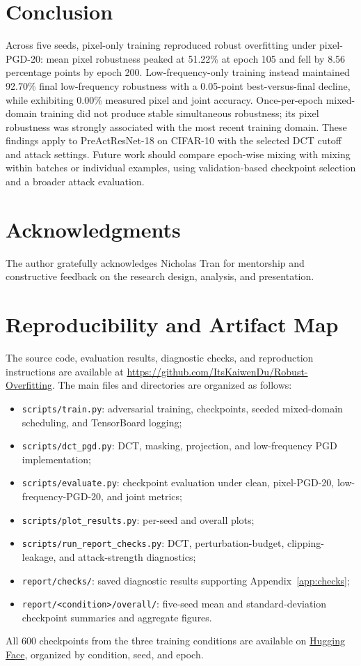 \documentclass[11pt]{article}
\begin{document}
\section{Conclusion}
\label{sec:conclusion}
Across five seeds, pixel-only training reproduced robust overfitting under
pixel-PGD-20: mean pixel robustness peaked at 51.22\% at epoch 105 and fell
by 8.56 percentage points by epoch 200. Low-frequency-only training instead
maintained 92.70\% final low-frequency robustness with a 0.05-point
best-versus-final decline, while exhibiting 0.00\% measured pixel and
joint accuracy. Once-per-epoch mixed-domain training did not produce
stable simultaneous robustness; its pixel robustness was strongly associated
with the most recent training domain. These findings apply to PreActResNet-18 on CIFAR-10 with the selected DCT
cutoff and attack settings. Future work should compare epoch-wise mixing
with mixing within batches or individual examples, using validation-based
checkpoint selection and a broader attack evaluation.

\section*{Acknowledgments}
The author gratefully acknowledges Nicholas Tran for mentorship and
constructive feedback on the research design, analysis, and presentation.

\section*{Reproducibility and Artifact Map}
The source code, evaluation results, diagnostic checks, and reproduction
instructions are available at
\url{https://github.com/ItsKaiwenDu/Robust-Overfitting}.
The main files and directories are organized as follows:
\begin{itemize}
  \item \texttt{scripts/train.py}: adversarial training, checkpoints, seeded
  mixed-domain scheduling, and TensorBoard logging;
  \item \texttt{scripts/dct\_pgd.py}: DCT, masking, projection, and
  low-frequency PGD implementation;
  \item \texttt{scripts/evaluate.py}: checkpoint evaluation under clean,
  pixel-PGD-20, low-frequency-PGD-20, and joint metrics;
  \item \texttt{scripts/plot\_results.py}: per-seed and overall plots;
  \item \texttt{scripts/run\_report\_checks.py}: DCT, perturbation-budget,
  clipping-leakage, and attack-strength diagnostics;
  \item \texttt{report/checks/}: saved diagnostic results supporting Appendix~\ref{app:checks};
  \item \texttt{report/<condition>/overall/}: five-seed mean and
  standard-deviation checkpoint summaries and aggregate figures.
\end{itemize}
All 600 checkpoints from the three training conditions are available on
\href{https://huggingface.co/KaiwenDu/robust-overfitting-checkpoints}{Hugging Face},
organized by condition, seed, and epoch.
\end{document}
